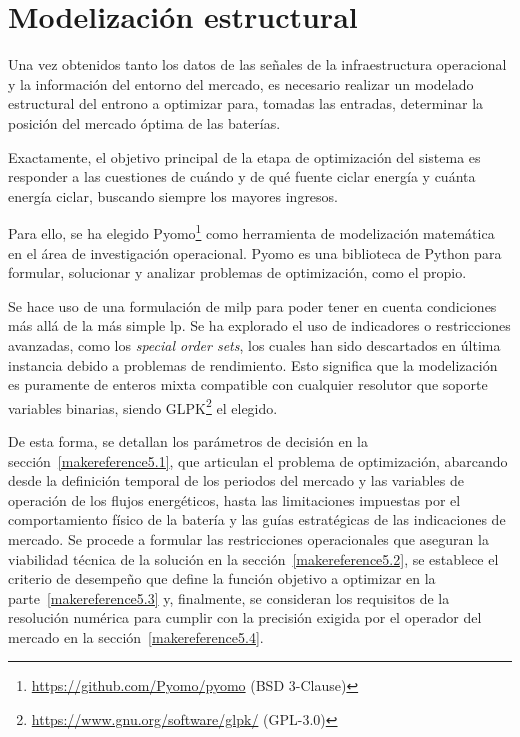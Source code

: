 
\cleardoublepage%

\chapter{Modelización estructural}%
\label{makereference5}

Una vez obtenidos tanto los datos de las señales de la infraestructura operacional y la información del entorno del mercado, es necesario realizar un modelado estructural del entrono a optimizar para, tomadas las entradas, determinar la posición del mercado óptima de las baterías.

Exactamente, el objetivo principal de la etapa de optimización del sistema es responder a las cuestiones de cuándo y de qué fuente ciclar energía y cuánta energía ciclar, buscando siempre los mayores ingresos.

Para ello, se ha elegido Pyomo\footnote{\url{https://github.com/Pyomo/pyomo} (BSD 3-Clause)} como herramienta de modelización matemática en el área de investigación operacional. Pyomo es una biblioteca de Python para formular, solucionar y analizar problemas de optimización, como el propio.

Se hace uso de una formulación de \gls{milp} para poder tener en cuenta condiciones más allá de la más simple \gls{lp}. Se ha explorado el uso de indicadores o restricciones avanzadas, como los \textit{special order sets}, los cuales han sido descartados en última instancia debido a problemas de rendimiento. Esto significa que la modelización es puramente de enteros mixta compatible con cualquier resolutor que soporte variables binarias, siendo GLPK\footnote{\url{https://www.gnu.org/software/glpk/} (GPL-3.0)} el elegido.

De esta forma, se detallan los parámetros de decisión en la sección~\ref{makereference5.1}, que articulan el problema de optimización, abarcando desde la definición temporal de los periodos del mercado y las variables de operación de los flujos energéticos, hasta las limitaciones impuestas por el comportamiento físico de la batería y las guías estratégicas de las indicaciones de mercado. Se procede a formular las restricciones operacionales que aseguran la viabilidad técnica de la solución en la sección~\ref{makereference5.2}, se establece el criterio de desempeño que define la función objetivo a optimizar en la parte~\ref{makereference5.3} y, finalmente, se consideran los requisitos de la resolución numérica para cumplir con la precisión exigida por el operador del mercado en la sección~\ref{makereference5.4}.

